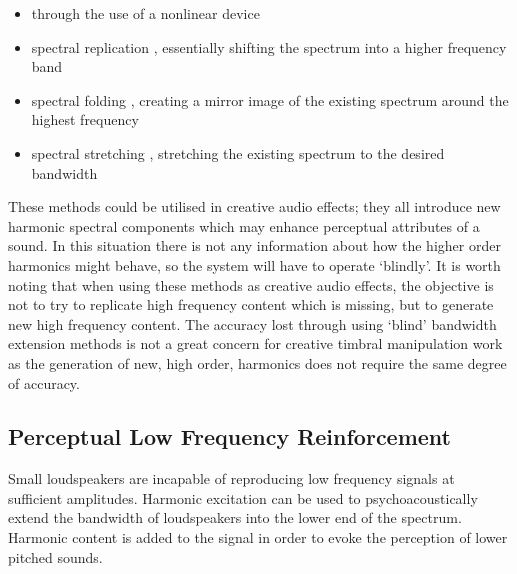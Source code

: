 		\begin{itemize}
			\item through the use of a nonlinear device \citep{larsen2002efficient, sha2010high}
			\item spectral replication \citep{nagel2010a}, essentially shifting the spectrum into a higher
				frequency band
			\item spectral folding \citep{friedrich2007spectral}, creating a mirror image of the existing
			      spectrum around the highest frequency
			\item spectral stretching \citep{nagel2009a}, stretching the existing spectrum to the desired
			      bandwidth
		\end{itemize}

		These methods could be utilised in creative audio effects; they all introduce new harmonic spectral
		components which may enhance perceptual attributes of a sound. In this situation there is not any
		information about how the higher order harmonics might behave, so the system will have to operate
		`blindly'. It is worth noting that when using these methods as creative audio effects, the objective is not
		to try to replicate high frequency content which is missing, but to generate new high frequency content.
		The accuracy lost through using `blind' bandwidth extension methods is not a great concern for creative
		timbral manipulation work as the generation of new, high order, harmonics does not require the same degree
		of accuracy.

	\subsection{Perceptual Low Frequency Reinforcement}
	\label{sec:Excitation-Uses-Reinforcement}
		Small loudspeakers are incapable of reproducing low frequency signals at sufficient amplitudes. Harmonic
		excitation can be used to psychoacoustically extend the bandwidth of loudspeakers into the lower end of the
		spectrum. Harmonic content is added to the signal in order to evoke the perception of lower pitched sounds.
		
